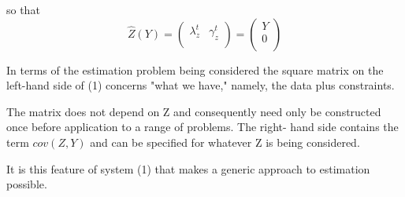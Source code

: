\documentclass[12pt, a4paper]{article}
\begin{document}
so that
\[ \hat{Z}(Y) =
\left(
\begin{array}{cc}
\lambda_{z}^{t}&
\gamma_z^{t} \\
\end{array}
\right)=\left(
\begin{array}{c}
Y \\
0 \\
\end{array}
\right) \]

In terms of the estimation problem being considered the square matrix on the left-hand side of (1) concerns "what we have," namely, the data plus constraints.

The matrix does not depend on Z and consequently need only be constructed once before application to a range of problems. The right- hand side contains the term $cov(Z,Y)$ and can be specified for whatever Z is being considered.

It is this feature of system (1) that makes a generic approach to estimation possible.



\newpage
\end{document}

